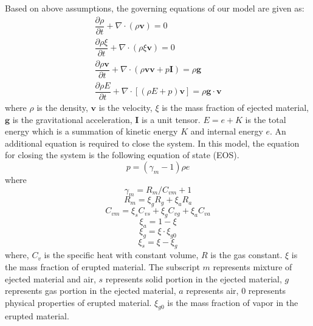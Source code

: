 \documentclass[utf8]{frontiersSCNS} %
\begin{document}
Based on above assumptions, the governing equations of our model are given as:
\begin{align}
\dfrac{\partial \rho}{\partial t} + \nabla \cdot \left(\rho \textbf{v}\right) = 0 \label{eq:gov-cs-rho} \\
\dfrac{\partial \rho \xi}{\partial t} + \nabla \cdot \left(\rho \xi \textbf{v}\right) = 0 \label{eq:gov-cs-ks}\\
\dfrac{\partial \rho \textbf{v}}{\partial t} + \nabla \cdot \left(\rho \textbf{v} \textbf{v} + p\textbf{I}\right) = \rho \textbf{g} \label{eq:gov-cs-v} \\
\dfrac{\partial \rho E}{\partial t} + \nabla \cdot \left[\left(\rho E + p \right)\textbf{v}\right] = \rho \textbf{g} \cdot\textbf{v} \label{eq:gov-cs-e}
\end{align}
where $\rho$ is the density, $\textbf{v}$ is the velocity, $\xi$ is the mass fraction of ejected material, $\textbf{g}$ is the gravitational acceleration, $\textbf{I}$ is a unit tensor.
$E = e + K $ is the total energy which is a summation of kinetic energy $K$ and internal energy $e$.
An additional equation is required to close the system. In this model, the equation for closing the system is the following equation of state (EOS).
\begin{equation}
p = \left(\gamma_m - 1\right)\rho e \label{eq:EOS}
\end{equation}
where
\begin{equation}
\gamma_m = R_m/C_{vm} + 1 \label{eq:gov-gm}
\end{equation}
\begin{equation}
R_m = \xi_g R_g + \xi_a R_a  \label{eq:gov-Rm}
\end{equation}
\begin{equation}
C_{vm} = \xi_s C_{vs} + \xi_g C_{vg} + \xi_a C_{va} \label{eq:gov-Cvm}
\end{equation}
\begin{equation}
\xi_a = 1 - \xi \label{eq:gov-na}
\end{equation}
\begin{equation}
\xi_g = \xi \cdot \xi_{g0} \label{eq:gov-ng}
\end{equation}
\begin{equation}
\xi_s = \xi - \xi_g \label{eq:gov-ns}
\end{equation}
where, $C_v$ is the specific heat with constant volume, $R$ is the gas constant. $\xi$ is the mass fraction of erupted material. The subscript $m$ represents mixture of ejected material and air, $s$ represents solid portion in the ejected material, $g$ represents gas portion in the ejected material, $a$ represents air, $0$ represents physical properties of erupted material. $\xi_{g0}$ is the mass fraction of vapor in the erupted material.
\end{document}

